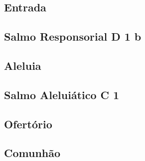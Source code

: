 
\subsection{Entrada}\label{subsection:tempus-nativitatis/sanctae-familiae/introitus}

\AllowPageFlush

\subsection{Salmo Responsorial \textmd{D 1 b}}\label{subsection:tempus-nativitatis/sanctae-familiae/psalmus-responsorius}

\AllowPageFlush

\subsection{Aleluia}\label{subsection:tempus-nativitatis/sanctae-familiae/alleluia}

\AllowPageFlush

\subsection[Salmo Aleluiático]{Salmo Aleluiático \textmd{C 1}}\label{subsection:tempus-nativitatis/sanctae-familiae/psalmus-alleluiaticus}

\AllowPageFlush

\subsection{Ofertório}\label{subsection:tempus-nativitatis/sanctae-familiae/offertorium}

\AllowPageBreak

\subsection{Comunhão}\label{subsection:tempus-nativitatis/sanctae-familiae/communio}

\AllowPageBreak